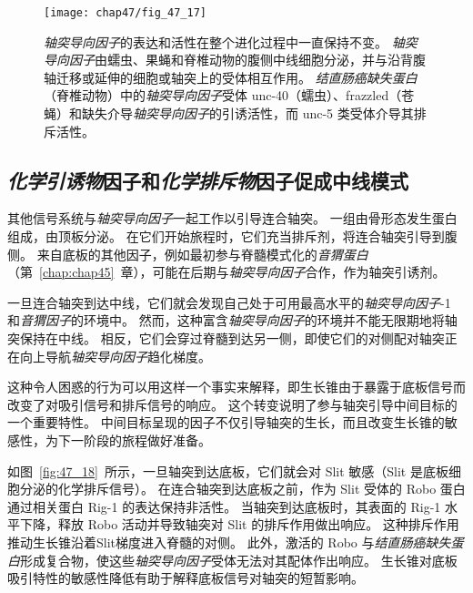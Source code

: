 \begin{figure}[htbp]
	\centering
	\texttt{[image: chap47/fig\_47\_17]}
	\caption{\textit{轴突导向因子}的表达和活性在整个进化过程中一直保持不变。
		\textit{轴突导向因子}由蠕虫、果蝇和脊椎动物的腹侧中线细胞分泌，并与沿背腹轴迁移或延伸的细胞或轴突上的受体相互作用。
		\textit{结直肠癌缺失蛋白}（脊椎动物）中的\textit{轴突导向因子}受体 unc-40（蠕虫）、frazzled（苍蝇）和缺失介导\textit{轴突导向因子}的引诱活性，而 unc-5 类受体介导其排斥活性。}
	\label{fig:47_17}
\end{figure}



\subsection{\textit{化学引诱物}因子和\textit{化学排斥物}因子促成中线模式}

其他信号系统与\textit{轴突导向因子}一起工作以引导连合轴突。
一组由骨形态发生蛋白组成，由顶板分泌。
在它们开始旅程时，它们充当排斥剂，将连合轴突引导到腹侧。
来自底板的其他因子，例如最初参与脊髓模式化的\textit{音猬蛋白}（第~\ref{chap:chap45}~章），可能在后期与\textit{轴突导向因子}合作，作为轴突引诱剂。


一旦连合轴突到达中线，它们就会发现自己处于可用最高水平的\textit{轴突导向因子}-1 和\textit{音猬因子}的环境中。
然而，这种富含\textit{轴突导向因子}的环境并不能无限期地将轴突保持在中线。
相反，它们会穿过脊髓到达另一侧，即使它们的对侧配对轴突正在向上导航\textit{轴突导向因子}趋化梯度。


这种令人困惑的行为可以用这样一个事实来解释，即生长锥由于暴露于底板信号而改变了对吸引信号和排斥信号的响应。
这个转变说明了参与轴突引导中间目标的一个重要特性。
中间目标呈现的因子不仅引导轴突的生长，而且改变生长锥的敏感性，为下一阶段的旅程做好准备。


如图~\ref{fig:47_18}~所示，一旦轴突到达底板，它们就会对 Slit 敏感（Slit 是底板细胞分泌的化学排斥信号）。
在连合轴突到达底板之前，作为 Slit 受体的 Robo 蛋白通过相关蛋白 Rig-1 的表达保持非活性。
当轴突到达底板时，其表面的 Rig-1 水平下降，释放 Robo 活动并导致轴突对 Slit 的排斥作用做出响应。
这种排斥作用推动生长锥沿着Slit梯度进入脊髓的对侧。
此外，激活的 Robo 与\textit{结直肠癌缺失蛋白}形成复合物，使这些\textit{轴突导向因子}受体无法对其配体作出响应。
生长锥对底板吸引特性的敏感性降低有助于解释底板信号对轴突的短暂影响。


